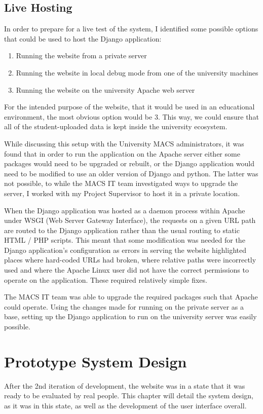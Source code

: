 \documentclass[a4paper,11pt]{report}
\begin{document}
\section{Live Hosting}
In order to prepare for a live test of the system, I identified some possible options that could be used to host the Django application:
\begin{enumerate}
\item Running the website from a private server
\item Running the website in local debug mode from one of the university machines
\item Running the website on the university Apache web server
\end{enumerate}
For the intended purpose of the website, that it would be used in an educational environment, the most obvious option would be 3. This way, we could ensure that all of the student-uploaded data is kept inside the university ecosystem.\par
While discussing this setup with the University MACS administrators, it was found that in order to run the application on the Apache server either some packages would need to be upgraded or rebuilt, or the Django application would need to be modified to use an older version of Django and python. The latter was not possible, to while the MACS IT team investigated ways to upgrade the server, I worked with my Project Supervisor to host it in a private location.\par
When the Django application was hosted as a daemon process within Apache under WSGI (Web Server Gateway Interface), the requests on a given URL path are routed to the Django application rather than the usual routing to static HTML / PHP scripts. This meant that some modification was needed for the Django application's configuration as errors in serving the website highlighted places where  hard-coded URLs had broken, where relative paths were incorrectly used and where the Apache Linux user did not have the correct permissions to operate on the application. These required relatively simple fixes.\par
The MACS IT team was able to upgrade the required packages such that Apache could operate. Using the changes made for running on the private server as a base, setting up the Django application to run on the university server was easily possible.


\chapter{Prototype System Design}
\label{ch:protosd}
After the 2nd iteration of development, the website was in a state that it was ready to be evaluated by real people. This chapter will detail the system design, as it was in this state, as well as the development of the user interface overall.
\end{document}
